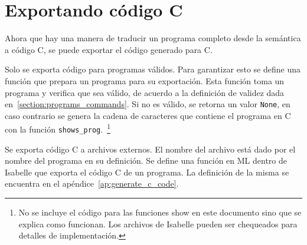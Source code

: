 \begin{comment}
  intptr_t n;
  intptr_t r;

  intptr_t fact(intptr_t n) {
    intptr_t r;
    intptr_t i;
    r = (1);
    i = (1);
    while ((i) < ((n) + (1))) {
      r = ((r) * (i));
      i = ((i) + (1));
    }
    return(r);
  }

  intptr_t main() {
    n = (5);
    (r) = (fact(n));
  }
\end{lstlisting}
\caption{Programa traducido a C}
\label{fig:factorial_c}
\end{figure}

\end{comment}

\section{Exportando código C}\label{section:exporting_c_code}

Ahora que hay una manera de traducir un programa completo desde la semántica a código C, se puede exportar el código generado para C.


\begin{comment}
\begin{lstlisting}[mathescape=true]
  definition prepare_export :: "program $\Rightarrow$ string option" where
    "prepare_export prog $\equiv$ do {
      assert (valid_program prog);
      Some (shows_prog prog '''')
    }"
\end{lstlisting}
\end{comment}

Solo se exporta código para programas válidos.
Para garantizar esto se define una función que prepara un programa para su exportación.
Esta función toma un programa y verifica que sea válido, de acuerdo a la definición de validez dada en~\ref{section:programs_commands}.
Si no es válido, se retorna un valor \verb|None|, en caso contrario se genera la cadena de caracteres que contiene el programa en C con la función \verb|shows_prog|.~\footnote{No se incluye el código para las funciones show en este documento sino que se explica como funcionan. Los archivos de Isabelle pueden ser chequeados para detalles de implementación.}

Se exporta código C a archivos externos.
El nombre del archivo está dado por el nombre del programa en su definición.
Se define una función en ML dentro de Isabelle que exporta el código C de un programa.
La definición de la misma se encuentra en el apéndice~\ref{ap:generate_c_code}.


